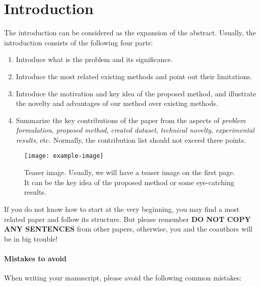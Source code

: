 \section{Introduction}
\label{sec:intro}
The introduction can be considered as the expansion of the abstract. Usually, the introduction consists of the following four parts:
\begin{enumerate}[itemsep=0pt,parsep=0pt,topsep=2bp]
    \item Introduce what is the problem and its significance.
    \item Introduce the most related existing methods and point out their limitations.
    \item Introduce the motivation and key idea of the proposed method, and illustrate the novelty and advantages of our method over existing methods.
    \item Summarize the key contributions of the paper from the aspects of \emph{problem formulation}, \emph{proposed method}, \emph{created dataset}, \emph{technical novelty}, \emph{experimental results}, etc. Normally, the contribution list should not exceed three points.
\end{enumerate}

\begin{figure}[tb] \centering
    \texttt{[image: example-image]}
    \caption{Teaser image. Usually, we will have a teaser image on the first page. It can be the key idea of the proposed method or some eye-catching results.} \label{fig:figure1}
\end{figure}

\vspace{3pt}
If you do not know how to start at the very beginning, you may find a most related paper and follow its structure. But please remember \textbf{DO NOT COPY ANY SENTENCES} from other papers, otherwise, you and the coauthors will be in big trouble!

\vspace{3pt}
\paragraph{Mistakes to avoid} When writing your manuscript, please avoid the following common mistakes:

